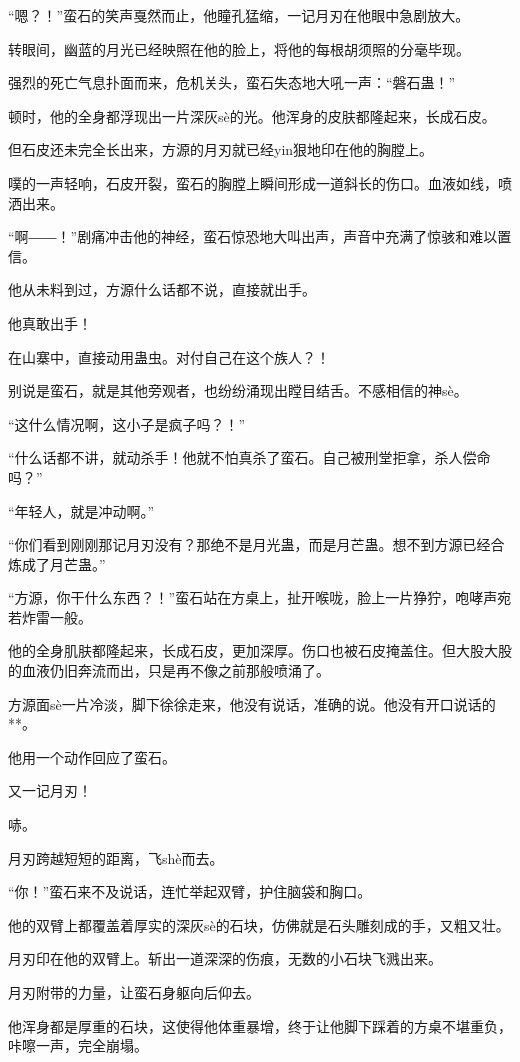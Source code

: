 \begin{this_body}
“嗯？！”蛮石的笑声戛然而止，他瞳孔猛缩，一记月刃在他眼中急剧放大。

转眼间，幽蓝的月光已经映照在他的脸上，将他的每根胡须照的分毫毕现。

强烈的死亡气息扑面而来，危机关头，蛮石失态地大吼一声：“磐石蛊！”

顿时，他的全身都浮现出一片深灰sè的光。他浑身的皮肤都隆起来，长成石皮。

但石皮还未完全长出来，方源的月刃就已经yin狠地印在他的胸膛上。

噗的一声轻响，石皮开裂，蛮石的胸膛上瞬间形成一道斜长的伤口。血液如线，喷洒出来。

“啊――！”剧痛冲击他的神经，蛮石惊恐地大叫出声，声音中充满了惊骇和难以置信。

他从未料到过，方源什么话都不说，直接就出手。

他真敢出手！

在山寨中，直接动用蛊虫。对付自己在这个族人？！

别说是蛮石，就是其他旁观者，也纷纷涌现出瞠目结舌。不感相信的神sè。

“这什么情况啊，这小子是疯子吗？！”

“什么话都不讲，就动杀手！他就不怕真杀了蛮石。自己被刑堂拒拿，杀人偿命吗？”

“年轻人，就是冲动啊。”

“你们看到刚刚那记月刃没有？那绝不是月光蛊，而是月芒蛊。想不到方源已经合炼成了月芒蛊。”

“方源，你干什么东西？！”蛮石站在方桌上，扯开喉咙，脸上一片狰狞，咆哮声宛若炸雷一般。

他的全身肌肤都隆起来，长成石皮，更加深厚。伤口也被石皮掩盖住。但大股大股的血液仍旧奔流而出，只是再不像之前那般喷涌了。

方源面sè一片冷淡，脚下徐徐走来，他没有说话，准确的说。他没有开口说话的**。

他用一个动作回应了蛮石。

又一记月刃！

哧。

月刃跨越短短的距离，飞shè而去。

“你！”蛮石来不及说话，连忙举起双臂，护住脑袋和胸口。

他的双臂上都覆盖着厚实的深灰sè的石块，仿佛就是石头雕刻成的手，又粗又壮。

月刃印在他的双臂上。斩出一道深深的伤痕，无数的小石块飞溅出来。

月刃附带的力量，让蛮石身躯向后仰去。

他浑身都是厚重的石块，这使得他体重暴增，终于让他脚下踩着的方桌不堪重负，咔嚓一声，完全崩塌。


\end{this_body}
